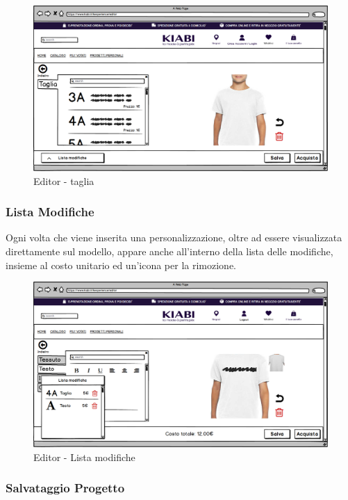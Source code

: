 \documentclass[12pt,italian,]{report}
\begin{document}
\begin{figure}[h]
\centering
\includegraphics{balsamiq/Editor - caratteristica capo taglia.png}
\caption{Editor - taglia}
\label{editor_taglia}
\end{figure}

\newpage
\subsubsection{Lista Modifiche} 

Ogni volta che viene inserita una personalizzazione, oltre ad essere visualizzata direttamente sul modello, appare anche all'interno della lista delle modifiche, insieme al costo unitario ed un'icona per la rimozione.

\begin{figure}[h]
\centering
\includegraphics{balsamiq/Editor - caratteristica busto testo 4.png}
\caption{Editor - Lista modifiche}
\label{editor_listamod}
\end{figure}


\newpage
\subsubsection{Salvataggio Progetto} 
\end{document}
